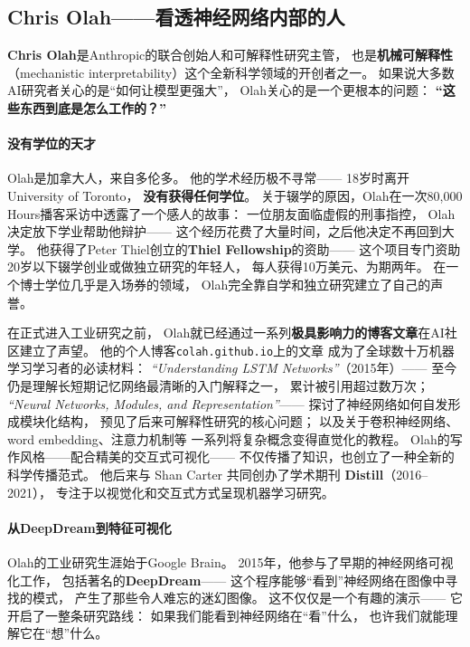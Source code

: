 \subsection{Chris Olah——看透神经网络内部的人}
\label{subsec:olah}

\textbf{Chris Olah}是Anthropic的联合创始人和可解释性研究主管，
也是\textbf{机械可解释性}（mechanistic interpretability）这个全新科学领域的开创者之一。
如果说大多数AI研究者关心的是``如何让模型更强大''，
Olah关心的是一个更根本的问题：
\textbf{``这些东西到底是怎么工作的？''}

\paragraph{没有学位的天才}
Olah是加拿大人，来自多伦多。
他的学术经历极不寻常——
18岁时离开University of Toronto，
\textbf{没有获得任何学位}。
关于辍学的原因，Olah在一次80,000 Hours播客采访中透露了一个感人的故事：
一位朋友面临虚假的刑事指控，
Olah决定放下学业帮助他辩护——
这个经历花费了大量时间，之后他决定不再回到大学。
他获得了Peter Thiel创立的\textbf{Thiel Fellowship}的资助——
这个项目专门资助20岁以下辍学创业或做独立研究的年轻人，
每人获得10万美元、为期两年。
在一个博士学位几乎是入场券的领域，
Olah完全靠自学和独立研究建立了自己的声誉。

在正式进入工业研究之前，
Olah就已经通过一系列\textbf{极具影响力的博客文章}在AI社区建立了声望。
他的个人博客\texttt{colah.github.io}上的文章
成为了全球数十万机器学习学习者的必读材料：
\textit{``Understanding LSTM Networks''}（2015年）——
至今仍是理解长短期记忆网络最清晰的入门解释之一，
累计被引用超过数万次；
\textit{``Neural Networks, Modules, and Representation''}——
探讨了神经网络如何自发形成模块化结构，
预见了后来可解释性研究的核心问题；
以及关于卷积神经网络、word embedding、注意力机制等
一系列将复杂概念变得直觉化的教程。
Olah的写作风格——配合精美的交互式可视化——
不仅传播了知识，也创立了一种全新的科学传播范式。
他后来与 Shan Carter 共同创办了学术期刊
\textbf{Distill}（2016--2021），
专注于以视觉化和交互式方式呈现机器学习研究。

\paragraph{从DeepDream到特征可视化}
Olah的工业研究生涯始于Google Brain。
2015年，他参与了早期的神经网络可视化工作，
包括著名的\textbf{DeepDream}——
这个程序能够``看到''神经网络在图像中寻找的模式，
产生了那些令人难忘的迷幻图像。
这不仅仅是一个有趣的演示——
它开启了一整条研究路线：
如果我们能看到神经网络在``看''什么，
也许我们就能理解它在``想''什么。

